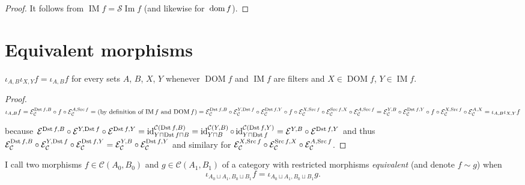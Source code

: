 \begin{proof}
It follows from $\operatorname{IM}f=\mathscr{S}\operatorname{Im}f$
(and likewise for~$\operatorname{dom} f$).
\end{proof}

\section{Equivalent morphisms}

\begin{prop}\label{two-iotas}
  $\iota_{A, B} \iota_{X, Y} f = \iota_{A, B} f$ for every sets $A$, $B$, $X$,
  $Y$ whenever $\operatorname{DOM} f$ and $\operatorname{IM} f$ are filters and $X \in
  \operatorname{DOM} f$, $Y \in \operatorname{IM} f$.
\end{prop}

\begin{proof}
  $\iota_{A, B} f =\mathcal{E}_{\mathcal{C}}^{\operatorname{Dst} f, B} \circ f \circ
  \mathcal{E}_{\mathcal{C}}^{A, \operatorname{Src} f} = \text{(by definition of
  $\operatorname{IM} f$ and $\operatorname{DOM} f$)} =\mathcal{E}_{\mathcal{C}}^{\operatorname{Dst} f,
  B} \circ \mathcal{E}_{\mathcal{C}}^{Y, \operatorname{Dst} f} \circ
  \mathcal{E}_{\mathcal{C}}^{\operatorname{Dst} f, Y} \circ f \circ
  \mathcal{E}_{\mathcal{C}}^{X, \operatorname{Src} f} \circ
  \mathcal{E}_{\mathcal{C}}^{\operatorname{Src} f, X} \circ
  \mathcal{E}_{\mathcal{C}}^{A, \operatorname{Src} f} =\mathcal{E}_{\mathcal{C}}^{Y,
  B} \circ \mathcal{E}_{\mathcal{C}}^{\operatorname{Dst} f, Y} \circ f \circ
  \mathcal{E}_{\mathcal{C}}^{X, \operatorname{Src} f} \circ
  \mathcal{E}_{\mathcal{C}}^{A, X} = \iota_{A, B} \iota_{X, Y} f$
  
  because $\mathcal{E}^{\operatorname{Dst} f, B} \circ \mathcal{E}^{Y, \operatorname{Dst} f}
  \circ \mathcal{E}^{\operatorname{Dst} f, Y} = \operatorname{id}^{\mathcal{C}(\operatorname{Dst} f, B)}_{Y \sqcap
  \operatorname{Dst} f \sqcap B} = \operatorname{id}^{\mathcal{C}(Y, B)}_{Y \sqcap B} \circ \operatorname{id}^{\mathcal{C}(\operatorname{Dst} f,Y)}_{Y \sqcap \operatorname{Dst} f} = \mathcal{E}^{Y, B} \circ
  \mathcal{E}^{\operatorname{Dst} f, Y}$ and thus
  $\mathcal{E}_{\mathcal{C}}^{\operatorname{Dst} f, B} \circ
  \mathcal{E}_{\mathcal{C}}^{Y, \operatorname{Dst} f} \circ
  \mathcal{E}_{\mathcal{C}}^{\operatorname{Dst} f, Y} =\mathcal{E}_{\mathcal{C}}^{Y,
  B} \circ \mathcal{E}_{\mathcal{C}}^{\operatorname{Dst} f, Y}$ and similary for
  $\mathcal{E}_{\mathcal{C}}^{X, \operatorname{Src} f} \circ
  \mathcal{E}_{\mathcal{C}}^{\operatorname{Src} f, X} \circ
  \mathcal{E}_{\mathcal{C}}^{A, \operatorname{Src} f}$.
\end{proof}

\begin{defn}
I call two morphisms $f\in\mathcal{C}(A_0,B_0)$ and
$g\in\mathcal{C}(A_1,B_1)$
of a category with restricted morphisms \emph{equivalent}
(and denote $f\sim g$) when
\[\iota_{A_0\sqcup A_1,B_0\sqcup B_1}f=\iota_{A_0\sqcup A_1,B_0\sqcup B_1}g.\]
\end{defn}

